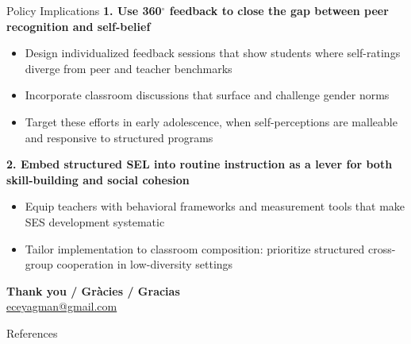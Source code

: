 \documentclass[xcolor=usenames,dvipsnames]{beamer}
\begin{document}
\begin{frame}{Policy Implications}\label{slide:policy}
\footnotesize
\textbf{1. Use 360$^{\circ}$ feedback to close the gap between peer recognition and self-belief}
\begin{itemize}
    \item Design individualized feedback sessions that show students where self-ratings diverge from peer and teacher benchmarks
    \item Incorporate classroom discussions that surface and challenge gender norms  \citep{Dhar2022-cn, Matavelli2025-gh}
    \item Target these efforts in early adolescence, when self-perceptions are malleable and responsive to structured programs \citep{Alan2025-jr}
\end{itemize}
\vspace{0.2cm}
\textbf{2. Embed structured SEL into routine instruction as a lever for both skill-building and social cohesion}
\begin{itemize}
    \item Equip teachers with behavioral frameworks and measurement tools that make SES development systematic
    \item Tailor implementation to classroom composition: prioritize structured cross-group cooperation in low-diversity settings 
\end{itemize}
\hyperlink{future}{}
\end{frame}



\begin{frame}[plain]
\vfill
\begin{center}
{\LARGE \textbf{Thank you / Gr\`acies / Gracias}}
\vspace{1cm}
 \\
\href{eceyagman@gmail.com}{eceyagman@gmail.com} \\

\end{center}
\vfill
\end{frame}
\appendix
\begin{frame}[allowframebreaks]{References}
\def\newblock{}

\end{frame}
\end{document}
